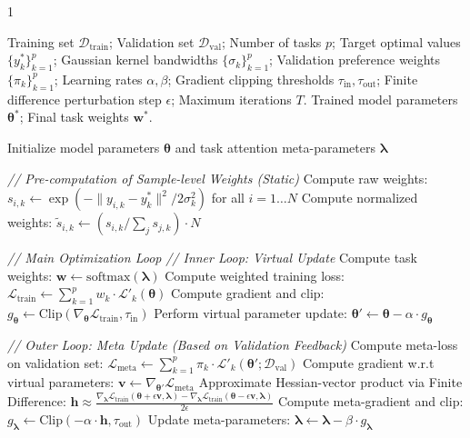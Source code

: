 \documentclass[11pt]{article}
\newcommand{\bicaption}[2]{\caption[#1]{#1\protect\\#2}}
\begin{document}
\begin{algorithm}[!h]
	\bicaption{DA-DGP modeling workflow.}{DA-DGP 建模流程。}
	\label{alg:da_dgp}
	\begin{spacing}{1}
		\vspace{0.5\baselineskip}
	\begin{algorithmic}[1] %
		\Require Training set $\mathcal{D}_{\text{train}}$; Validation set $\mathcal{D}_{\text{val}}$; Number of tasks $p$; Target optimal values $\{y_{k}^{*}\}_{k=1}^{p}$; Gaussian kernel bandwidths $\{\sigma _{k}\}_{k=1}^{p}$; Validation preference weights $\{\pi _{k}\}_{k=1}^{p}$; Learning rates $\alpha, \beta$; Gradient clipping thresholds $\tau_{\text{in}}, \tau_{\text{out}}$; Finite difference perturbation step $\epsilon$; Maximum iterations $T$.
		\Ensure Trained model parameters $\boldsymbol{\theta}^*$; Final task weights $\mathbf{w}^*$.
		
		\State Initialize model parameters $\boldsymbol{\theta}$ and task attention meta-parameters $\boldsymbol{\lambda}$
		
		\State \textit{// Pre-computation of Sample-level Weights (Static)}
		\State Compute raw weights: $s_{i,k} \gets \exp (-\|y_{i,k}-y_{k}^{*}\|^2 / 2\sigma_{k}^{2})$ for all $i=1 \dots N$
		\State Compute normalized weights: $\tilde{s}_{i,k} \gets (s_{i,k} / \sum_{j} s_{j,k}) \cdot N$
		\EndFor
		
		\State \textit{// Main Optimization Loop}
		\State \textit{// Inner Loop: Virtual Update}
		\State Compute task weights: $\mathbf{w} \gets \text{softmax}(\boldsymbol{\lambda})$
		\State Compute weighted training loss: $\mathcal{L}_{\text{train}} \gets \sum_{k=1}^{p} w_{k} \cdot \mathcal{L}'_{k}(\boldsymbol{\theta})$ 
		\State Compute gradient and clip: $g_{\boldsymbol{\theta}} \gets \text{Clip}(\nabla_{\boldsymbol{\theta}} \mathcal{L}_{\text{train}}, \tau_{\text{in}})$
		\State Perform virtual parameter update: $\boldsymbol{\theta}' \gets \boldsymbol{\theta} - \alpha \cdot g_{\boldsymbol{\theta}}$
		
		\State \textit{// Outer Loop: Meta Update (Based on Validation Feedback)}
		\State Compute meta-loss on validation set: $\mathcal{L}_{\text{meta}} \gets \sum_{k=1}^{p} \pi_{k} \cdot \mathcal{L}'_{k}(\boldsymbol{\theta}'; \mathcal{D}_{\text{val}})$
		\State Compute gradient w.r.t virtual parameters: $\mathbf{v} \gets \nabla_{\boldsymbol{\theta}'} \mathcal{L}_{\text{meta}}$
		\State Approximate Hessian-vector product via Finite Difference: 
		\Statex \qquad $\mathbf{h} \approx \frac{\nabla_{\boldsymbol{\lambda}} \mathcal{L}_{\text{train}}(\boldsymbol{\theta} + \epsilon \mathbf{v}, \boldsymbol{\lambda}) - \nabla_{\boldsymbol{\lambda}} \mathcal{L}_{\text{train}}(\boldsymbol{\theta} - \epsilon \mathbf{v}, \boldsymbol{\lambda})}{2\epsilon}$
		\State Compute meta-gradient and clip: $g_{\boldsymbol{\lambda}} \gets \text{Clip}(-\alpha \cdot \mathbf{h}, \tau_{\text{out}})$
		\State Update meta-parameters: $\boldsymbol{\lambda} \gets \boldsymbol{\lambda} - \beta \cdot g_{\boldsymbol{\lambda}}$
		

\end{algorithmic}
\end{spacing}
\end{algorithm}
\end{document}
